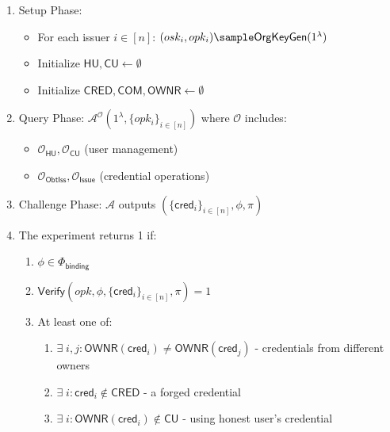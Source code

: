 \begin{enumerate}
    \item Setup Phase:
    \begin{itemize}
        \item For each issuer $i \in [n]$: $(osk_i, opk_i) \sample \mathsf{OrgKeyGen}(1^\lambda)$
        \item Initialize $\mathsf{HU, CU} \gets \emptyset$
        \item Initialize $\mathsf{CRED, COM, OWNR} \gets \emptyset$
    \end{itemize}

    \item Query Phase: $\mathcal{A}^{\mathcal{O}}(1^\lambda, \{opk_i\}_{i \in [n]})$ where $\mathcal{O}$ includes:
    \begin{itemize}
        \item $\mathcal{O}_{\mathsf{HU}}, \mathcal{O}_{\mathsf{CU}}$ (user management)
        \item $\mathcal{O}_{\mathsf{ObtIss}}, \mathcal{O}_{\mathsf{Issue}}$ (credential operations)
    \end{itemize}

    \item Challenge Phase: $\mathcal{A}$ outputs $(\{\mathsf{cred}_i\}_{i \in [n]}, \phi, \pi)$

    \item The experiment returns 1 if:
    \begin{enumerate}
        \item $\phi \in \Phi_{\mathsf{binding}}$
        \item $\mathsf{Verify}(opk, \phi, \{\mathsf{cred}_i\}_{i \in [n]}, \pi) = 1$
        \item At least one of:
            \begin{enumerate}
                \item $\exists \; i,j: \mathsf{OWNR}(\mathsf{cred}_i) \neq \mathsf{OWNR}(\mathsf{cred}_j)$ - credentials from different owners
                \item $\exists \; i: \mathsf{cred}_i \notin \mathsf{CRED}$ - a forged credential
                \item $\exists \; i: \mathsf{OWNR}(\mathsf{cred}_i) \notin \mathsf{CU}$ - using honest user's credential
            \end{enumerate}
    \end{enumerate}
\end{enumerate}



















